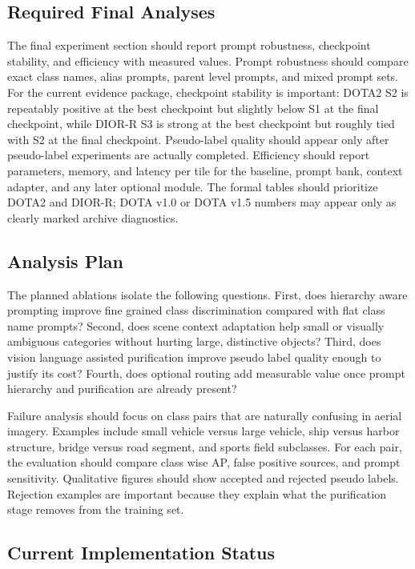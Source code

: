\documentclass[10pt]{article}
\begin{document}
\subsection{Required Final Analyses}

The final experiment section should report prompt robustness, checkpoint stability, and efficiency with measured values. Prompt robustness should compare exact class names, alias prompts, parent level prompts, and mixed prompt sets. For the current evidence package, checkpoint stability is important: DOTA2 S2 is repeatably positive at the best checkpoint but slightly below S1 at the final checkpoint, while DIOR-R S3 is strong at the best checkpoint but roughly tied with S2 at the final checkpoint. Pseudo-label quality should appear only after pseudo-label experiments are actually completed. Efficiency should report parameters, memory, and latency per tile for the baseline, prompt bank, context adapter, and any later optional module. The formal tables should prioritize DOTA2 and DIOR-R; DOTA v1.0 or DOTA v1.5 numbers may appear only as clearly marked archive diagnostics.

\subsection{Analysis Plan}

The planned ablations isolate the following questions. First, does hierarchy aware prompting improve fine grained class discrimination compared with flat class name prompts? Second, does scene context adaptation help small or visually ambiguous categories without hurting large, distinctive objects? Third, does vision language assisted purification improve pseudo label quality enough to justify its cost? Fourth, does optional routing add measurable value once prompt hierarchy and purification are already present?

Failure analysis should focus on class pairs that are naturally confusing in aerial imagery. Examples include small vehicle versus large vehicle, ship versus harbor structure, bridge versus road segment, and sports field subclasses. For each pair, the evaluation should compare class wise AP, false positive sources, and prompt sensitivity. Qualitative figures should show accepted and rejected pseudo labels. Rejection examples are important because they explain what the purification stage removes from the training set.

\subsection{Current Implementation Status}
\end{document}
